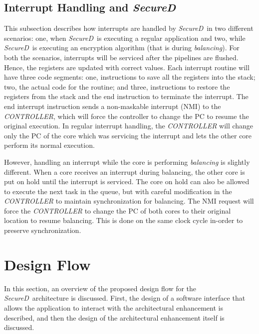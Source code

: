 \documentclass{article}
\newcommand{\SecureD}{\emph{SecureD}}
\begin{document}
\subsection{Interrupt Handling and \SecureD}
This subsection describes how interrupts are handled by \SecureD\  in
two different scenarios: one, when \SecureD\ is executing  a  regular
application and two, while \SecureD\ is  executing   an    encryption
algorithm (that is during \emph{balancing}). For  both the scenarios,
interrupts will be serviced  after  the pipelines are flushed. Hence,
the registers are updated with correct values. Each interrupt routine
will have three code segments:      one, instructions to save all the
registers into the stack; two, the actual code  for the routine;  and
three, instructions to  restore  the registers from the stack and the
end  instruction to terminate the interrupt. The end        interrupt
instruction    sends a           non-maskable interrupt (NMI)  to the
\emph{CONTROLLER}, which will force the controller to change   the PC
to resume the original execution. In  regular interrupt handling, the
\emph{CONTROLLER} will   change     only the PC of the core which was
servicing  the   interrupt and lets the other core perform its normal
execution.

However, handling  an interrupt          while the core is performing
\emph{balancing} is slightly different. When  a   core    receives an
interrupt during  balancing, the other core   is put on hold until the
interrupt is serviced. The core on hold can also be    allowed to
execute the next  task in the queue, but with careful modification
in the \emph{CONTROLLER}  to  maintain synchronization for balancing.
The NMI request will force the \emph{CONTROLLER} to change the PC  of
both cores to their original location to resume balancing. This is done
on the same clock cycle in-order to  preserve synchronization.

\section{Design Flow} \label{designflow}
In  this  section,  an  overview of the proposed design  flow for the
\SecureD\ architecture is discussed. First, the design of a  software
interface that allows  the      application   to    interact with the
architectural enhancement is described,    and then the design of the
architectural enhancement itself is discussed.
\end{document}
